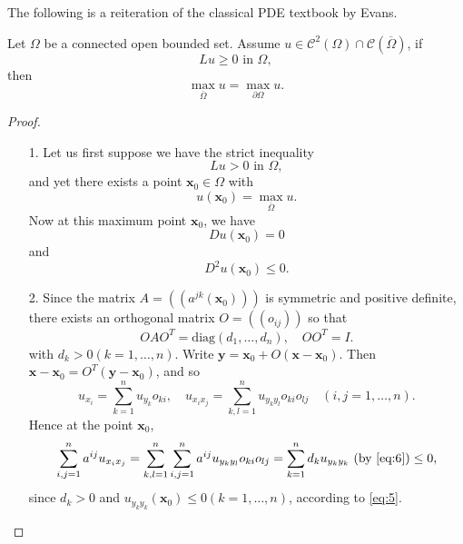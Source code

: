 \begin{sol}
  The following is a reiteration of the classical PDE textbook by Evans.
  \begin{thm}
    Let $\Omega$ be a connected open bounded set.
    Assume
    $u\in\mathcal{C}^2(\Omega)\cap\mathcal{C}(\overline{\Omega})$,
    if
    \begin{displaymath}
      Lu \ge 0 \text{ in } \Omega,
    \end{displaymath}
    then
    \begin{displaymath}
      \max_{\overline{\Omega}}u = \max_{\partial\Omega}u.
    \end{displaymath}
  \end{thm}
  \begin{proof}
    \begin{itemize}
    \item[1.]
      Let us first suppose we have the strict inequality
      \begin{equation}
        \label{eq:2}
        Lu > 0 \text{ in } \Omega,
      \end{equation}
      and yet there exists a point $\mathbf{x}_0\in\Omega$ with
      \begin{equation}
        \label{eq:3}
        u(\mathbf{x}_0) = \max_{\overline{\Omega}}u.
      \end{equation}
      Now at this maximum point $\mathbf{x}_0$,
      we have
      \begin{equation}
        \label{eq:4}
        Du(\mathbf{x}_0) = 0
      \end{equation}
      and
      \begin{equation}
        \label{eq:5}
        D^2u(\mathbf{x}_0) \le 0.
      \end{equation}

    \item[2.]
      Since the matrix $A=((a^{jk}(\mathbf{x}_0)))$ is symmetric
      and positive definite,
      there exists an orthogonal matrix $O = ((o_{ij}))$ so that
      \begin{equation}
        \label{eq:6}
        OAO^T = \text{diag}(d_1, \ldots, d_n), \quad OO^T = I.
      \end{equation}
      with $d_k>0 (k=1, \ldots, n)$.
      Write $\mathbf{y}=\mathbf{x}_0+O(\mathbf{x}-\mathbf{x}_0)$.
      Then $\mathbf{x}-\mathbf{x}_0=O^T(\mathbf{y}-\mathbf{x}_0)$,
      and so
      \begin{displaymath}
        u_{x_i} = \sum_{k=1}^nu_{y_k}o_{ki}, \quad
        u_{x_ix_j} = \sum_{k, l=1}^nu_{y_ky_l}o_{ki}o_{lj} \quad
        (i, j = 1, \ldots, n).
      \end{displaymath}
      Hence at the point $\mathbf{x}_0$,
      \begin{equation}
        \label{eq:7}
        \sum_{i,j=1}^na^{ij}u_{x_ix_j} = \sum_{k,l=1}^n\sum_{i,j=1}^na^{ij}
        u_{y_ky_l}o_{ki}o_{lj} = \sum_{k=1}^nd_ku_{y_ky_k} \text{ (by \eqref{eq:6})} \le 0,
      \end{equation}
      since $d_k>0$ and $u_{y_ky_k}(\mathbf{x}_0)\le 0 (k=1, \ldots, n)$,
      according to \eqref{eq:5}.


\end{itemize}
\end{proof}
\end{sol}
